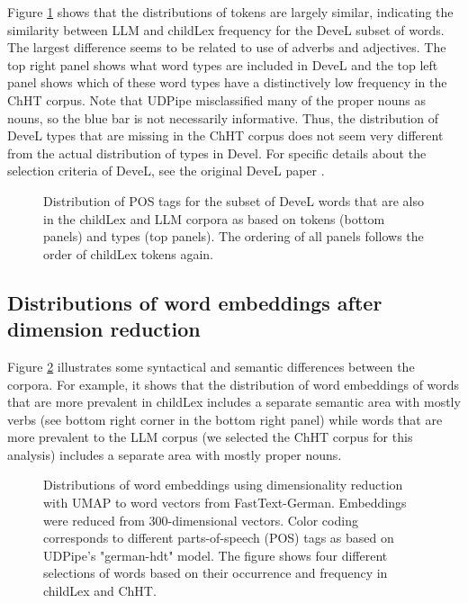 \documentclass[manuscript]{stjour}
\begin{document}
Figure \ref{fig:pos_f_devel} shows that the distributions of tokens are largely similar, indicating the similarity between LLM and childLex frequency for the DeveL subset of words. The largest difference seems to be related to use of adverbs and adjectives. The top right panel shows what word types are included in DeveL and the top left panel shows which of these word types have a distinctively low frequency in the ChHT corpus. Note that UDPipe misclassified many of the proper nouns as nouns, so the blue bar is not necessarily informative. Thus, the distribution of DeveL types that are missing in the ChHT corpus does not seem very different from the actual distribution of types in Devel.
For specific details about the selection criteria of DeveL, see the original DeveL paper \citep{schroter_developmental_2017}.

\begin{figure}[!htbp]
    \caption{Distribution of POS tags for the subset of DeveL words that are also in the childLex and LLM corpora as based on tokens (bottom panels) and types (top panels). The ordering of all panels follows the order of childLex tokens again. }
    \label{fig:pos_f_devel}
\end{figure}

\clearpage


\subsection{Distributions of word embeddings after dimension reduction}

Figure \ref{fig:embed100} illustrates some syntactical and semantic differences between the corpora. For example, it shows that the distribution of word embeddings of words that are more prevalent in childLex includes a separate semantic area with mostly verbs (see bottom right corner in the bottom right panel) while words that are more prevalent to the LLM corpus (we selected the ChHT corpus for this analysis) includes a separate area with mostly proper nouns. 

\begin{figure}[!htbp]
    \caption{Distributions of word embeddings using dimensionality reduction with UMAP to word vectors from FastText-German. Embeddings were reduced from 300-dimensional vectors. Color coding corresponds to different parts-of-speech (POS) tags as based on UDPipe's "german-hdt" model. The figure shows four different selections of words based on their occurrence and frequency in childLex and ChHT.}
    \label{fig:embed100}
\end{figure}
\end{document}
